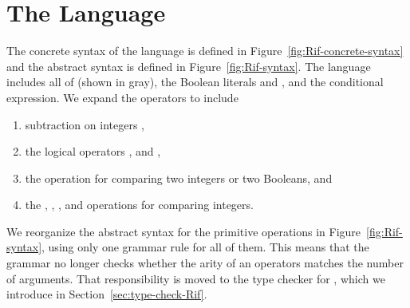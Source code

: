\documentclass[11pt]{book}
\newcommand{\ocaml}[1]{{\color{blue}{#1}}}
\begin{document}
{\section{The \LangIf{} Language}
\label{sec:lang-if}

The concrete syntax of the \LangIf{} language is defined in
Figure~\ref{fig:Rif-concrete-syntax} and the abstract syntax is defined
in Figure~\ref{fig:Rif-syntax}. The \LangIf{} language includes all of
\LangVar{} (shown in gray), the Boolean literals  and
, and the conditional  expression. We expand the
operators to include
\begin{enumerate}
\item subtraction on integers \ocaml{(OCaml version already had this)},
\item the logical operators ,  and ,
\item the  operation for comparing two integers or two Booleans, and
\item the \key{<}, \key{<=}, \key{>}, and \key{>=} operations for
  comparing integers.
\end{enumerate}
We reorganize the abstract syntax for the primitive operations in
Figure~\ref{fig:Rif-syntax}, using only one grammar rule for all of
them. This means that the grammar no longer checks whether the arity
of an operators matches the number of arguments. That responsibility
is moved to the type checker for \LangIf{}, which we introduce in
Section~\ref{sec:type-check-Rif}.

}
\end{document}
